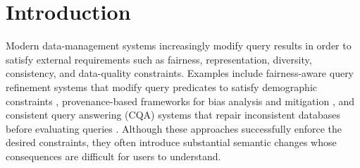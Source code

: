 \section{Introduction}
\label{sec:introduction}

Modern data-management systems increasingly modify query results
in order to satisfy external requirements such as fairness,
representation, diversity, consistency, and data-quality constraints.
Examples include fairness-aware query refinement systems that modify
query predicates to satisfy demographic constraints
\cite{ERICA,MK09},
provenance-based frameworks for bias analysis and mitigation
\cite{LMSJ23},
and consistent query answering (CQA) systems that repair
inconsistent databases before evaluating queries
\cite{arenas1999,bertossi2006,bertossi2011}.
Although these approaches successfully enforce the desired constraints,
they often introduce substantial semantic changes whose consequences
are difficult for users to understand.

